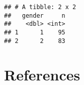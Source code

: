 \documentclass[man]{apa6}
\begin{document}
\begin{verbatim}
## # A tibble: 2 x 2
##   gender     n
##    <dbl> <int>
## 1      1    95
## 2      2    83
\end{verbatim}

\newpage

\hypertarget{references}{%
\section{References}\label{references}}

\begingroup
\setlength{\parindent}{-0.5in}
\setlength{\leftskip}{0.5in}

\hypertarget{refs}{}

\endgroup
\end{document}

